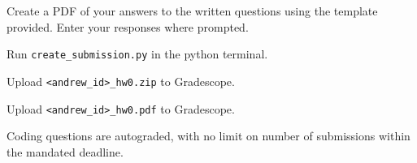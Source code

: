 \documentclass{16384_doc}
\begin{document}
\begin{submissionChecklist}
		\item Create a PDF of your answers to the written questions using the template provided. Enter your responses where prompted.
       	\item Run \verb!create_submission.py! in the python terminal.
       	\item Upload \verb!<andrew_id>_hw0.zip! to Gradescope.
        \item Upload \verb!<andrew_id>_hw0.pdf! to Gradescope.
        \item Coding questions are autograded, with no limit on number of submissions within the mandated deadline.
 
	\end{submissionChecklist}
\end{document}
